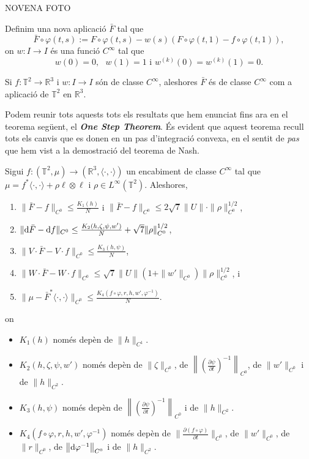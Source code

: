 {\color{blue} NOVENA FOTO}

Definim una nova aplicació $\bar F$ tal que
\begin{equation}
    \label{eq:def_barF}
    \bar F\circ\varphi(t,s) := F\circ\varphi(t,s) - w(s)(F\circ\varphi(t,1)-f\circ\varphi(t,1)),
\end{equation}
on $w:I\to I$ és una funció $C^\infty$ tal que 
\begin{equation*}
    w(0)=0, \text{ } w(1)=1 \text{ i } w^{(k)}(0)=w^{(k)}(1)=0.
\end{equation*}
\begin{lema}
    \label{lema:lema8}
    Si $f:\mathbb T^2\to\mathbb R^3$ i $w:I\to I$ són de classe $C^\infty$, aleshores $\bar F$ és de classe $C^\infty$ com a aplicació de $\mathbb T^2$ en $\mathbb R^3$.
\end{lema}
Podem reunir tots aquests tots els resultats que hem enunciat fins ara en el teorema següent, el \textbf{\textit{One Step Theorem}}. És evident que aquest teorema recull tots els canvis que es donen en un pas d'integració convexa, en el sentit de \textit{pas} que hem vist a la demostració del teorema de Nash.
\begin{teo}\label{teo:OneStep}
    Sigui $f:(\mathbb T^2, \mu)\to(\mathbb R^3, \langle\cdot, \cdot\rangle)$ un encabiment de classe $C^\infty$ tal que $\mu = f^*\langle\cdot, \cdot\rangle + \rho\ell\otimes\ell$ i $\rho\in L^\infty(\mathbb T^2)$. Aleshores, 
    \begin{enumerate}
        \item $\|\bar F-f\|_{C^0}\le\frac{K_1(h)}{N}$ i $\|\bar F-f\|_{C^0}\le 2\sqrt7\|U\|\cdot\|\rho\|^{1/2}_{C^0}$,
        \item $\|\text d\bar F-\text df\|_{C^0}\le\frac{K_2(h,\zeta,\psi,w')}{N} + \sqrt7\|\rho\|^{1/2}_{C^0}$,
        \item $\|V\cdot\bar F-V\cdot f\|_{C^0}\le\frac{K_3(h,\psi)}{N}$,
        \item $\|W\cdot\bar F-W\cdot f\|_{C^0}\le\sqrt7\|U\|(1+\|w'\|_{C^0})\|\rho\|^{1/2}_{C^0}$, i
        \item $\|\mu - \bar F^*\langle\cdot, \cdot\rangle\|_{C^0}\le\frac{K_4(f\circ\varphi,r,h,w',\varphi^{-1})}{N}$.
    \end{enumerate}
    on 
    \begin{itemize}
        \item $K_1(h)$ només depèn de $\|h\|_{C^1}$.
        \item $K_2(h,\zeta,\psi,w')$ només depèn de $\|\zeta\|_{C^0}$, de $\left\|\left(  \frac{\partial\psi}{\partial t}\right)^{-1}\right\|_{C^0}$, de $\|w'\|_{C^0}$ i de $\|h\|_{C^2}$.
        \item $K_3(h,\psi)$ només depèn de $\left\|\left(  \frac{\partial\psi}{\partial t}\right)^{-1}\right\|_{C^0}$ i de $\|h\|_{C^2}$.
        \item $K_4(f\circ\varphi,r,h,w',\varphi^{-1})$ només depèn de $\|\frac{\partial(f\circ\varphi)}{\partial t}\|_{C^0}$, de $\|w'\|_{C^0}$, de $\|r\|_{C^0}$, de $\left\|\text d\varphi^{-1}\right\|_{C^0}$ i de $\|h\|_{C^2}$.
    \end{itemize}
\end{teo}
